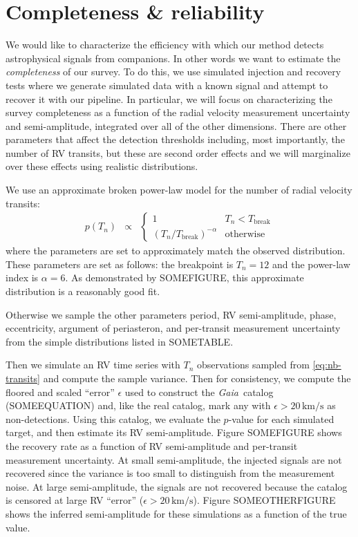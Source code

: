 \documentclass[modern, letterpaper]{aastex631}
\newcommand{\project}[1]{\textsl{#1}}
\newcommand{\Gaia}{\project{Gaia}}
\begin{document}
\section{Completeness \& reliability}

We would like to characterize the efficiency with which our method detects astrophysical signals from companions.
In other words we want to estimate the \emph{completeness} of our survey.
To do this, we use simulated injection and recovery tests where we generate simulated data with a known signal and attempt to recover it with our pipeline.
In particular, we will focus on characterizing the survey completeness as a function of the radial velocity measurement uncertainty and semi-amplitude, integrated over all of the other dimensions.
There are other parameters that affect the detection thresholds including, most importantly, the number of RV transits, but these are second order effects and we will marginalize over these effects using realistic distributions.

We use an approximate broken power-law model for the number of radial velocity transits:
\begin{eqnarray}
	\label{eq:nb-transits}
	p(T_n) &\propto& \left\{\begin{array}{ll}
		1                                  & T_n < T_\mathrm{break} \\
		(T_n / T_\mathrm{break})^{-\alpha} & \mathrm{otherwise}
	\end{array} \right.
\end{eqnarray}
where the parameters are set to approximately match the observed distribution.
These parameters are set as follows: the breakpoint is $T_n = 12$ and the power-law index is $\alpha = 6$.
As demonstrated by SOMEFIGURE, this approximate distribution is a reasonably good fit.

Otherwise we sample the other parameters period, RV semi-amplitude, phase, eccentricity, argument of periasteron, and per-transit measurement uncertainty from the simple distributions listed in SOMETABLE.

Then we simulate an RV time series with $T_n$ observations sampled from \autoref{eq:nb-transits} and compute the sample variance.
Then for consistency, we compute the floored and scaled ``error'' $\epsilon$ used to construct the \Gaia\ catalog (SOMEEQUATION) and, like the real catalog, mark any with $\epsilon > 20\,\mathrm{km/s}$ as non-detections.
Using this catalog, we evaluate the $p$-value for each simulated target, and then estimate its RV semi-amplitude.
Figure SOMEFIGURE shows the recovery rate as a function of RV semi-amplitude and per-transit measurement uncertainty.
At small semi-amplitude, the injected signals are not recovered since the variance is too small to distinguish from the measurement noise.
At large semi-amplitude, the signals are not recovered because the catalog is censored at large RV ``error'' ($\epsilon > 20\,\mathrm{km/s}$).
Figure SOMEOTHERFIGURE shows the inferred semi-amplitude for these simulations as a function of the true value.
\end{document}
